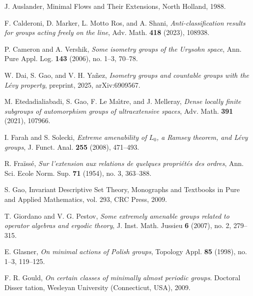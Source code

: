\documentclass{amsart}
\theoremstyle{definition}
\theoremstyle{remark}
\begin{document}






J. Auslander, 
Minimal Flows and Their Extensions,
North Holland, 1988.

F. Calderoni, D. Marker, L. Motto Ros, and A. Shani,
\textit{Anti-classification results for groups acting freely on the line},
Adv. Math. {\bf 418} (2023), 108938.

P. Cameron and A. Vershik,
\textit{Some isometry groups of the Urysohn space},
Ann. Pure Appl. Log. {\bf 143} (2006), no. 1--3, 70--78.

W. Dai, S. Gao, and V. H. Ya\~{n}ez,
\textit{Isometry groups and countable groups with the L\'{e}vy property}, preprint, 2025, arXiv:6909567.

M. Etedadialiabadi, S. Gao, F. Le Ma\^{\i}tre, and J. Melleray,
\textit{Dense locally finite subgroups of automorphism groups of ultraextensive spaces},
Adv. Math. {\bf 391} (2021), 107966.


I. Farah and S. Solecki,
\textit{Extreme amenability of $L_0$, a Ramsey theorem, and L\'{e}vy groups},
J. Funct. Anal. {\bf 255} (2008), 471--493.

R. Fra\"iss\'e, 
\textit{Sur l’extension aux relations de quelques propri\'et\'es des ordres},
Ann. Sci. Ecole Norm. Sup. {\bf 71} (1954), no. 3, 363--388. 

S. Gao,
Invariant Descriptive Set Theory,
Monographs and Textbooks in Pure and Applied Mathematics, vol. 293,
CRC Press, 2009.

T. Giordano and V. G. Pestov,
\textit{Some extremely amenable groups related to operator algebras and ergodic theory},
J. Inst. Math. Jussieu {\bf 6} (2007), no. 2, 279--315.

E. Glasner,
\textit{On minimal actions of Polish groups},
Topology Appl. {\bf 85} (1998), no. 1--3, 119--125. 

F. R. Gould, 
\textit{On certain classes of minimally almost periodic groups}. Doctoral Disser
tation, Wesleyan University (Connecticut, USA), 2009.
\end{document}
